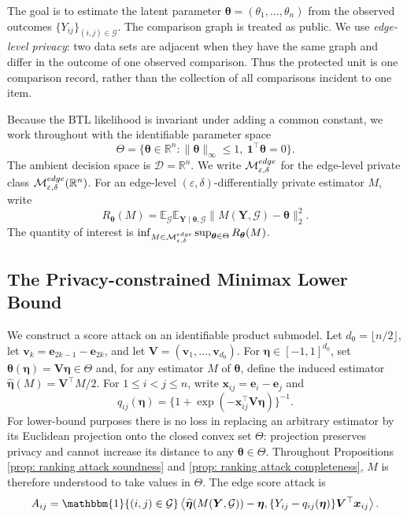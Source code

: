 \documentclass[letterpaper,12pt]{article}
\numberwithin{equation}{section}
\theoremstyle{plain}
\numberwithin{Theorem}{section}
\numberwithin{proposition}{section}
\numberwithin{Lemma}{section}
{
	\theoremstyle{definition}
	\newtheorem{Definition}{Definition}
	\newtheorem{example}{Example}
	\numberwithin{example}{section}
	\newtheorem{fact}{Fact}
	\numberwithin{fact}{section}
	\newtheorem{remark}{Remark}
}
\newcommand{\furtherrev}[1]{#1}
\newcommand{\1}{\mathbbm{1}}
\def\bth{{\boldsymbol{\theta}}}
\def\R{{\mathbb R}}
\def\E{\mathbb{E}}
\begin{document}
{
The goal is to estimate the latent parameter $\bth=(\theta_1,\ldots,\theta_n)$ from the observed outcomes $\{Y_{ij}\}_{(i,j)\in\mathcal G}$. The comparison graph is treated as public. We use \emph{edge-level privacy}: two data sets are adjacent when they have the same graph and differ in the outcome of one observed comparison. Thus the protected unit is one comparison record, rather than the collection of all comparisons incident to one item.

Because the BTL likelihood is invariant under adding a common constant, we work throughout with the identifiable parameter space
\[
\Theta=\{\bth\in\R^n:\|\bth\|_\infty\leq1,\ \bm1^\top\bth=0\}.
\]
\furtherrev{The ambient decision space is $\mathcal D=\mathbb R^n$. We write $\mathcal M^{\rm edge}_{\varepsilon,\delta}$ for the edge-level private class $\mathcal M^{\rm edge}_{\varepsilon,\delta}(\mathbb R^n)$.}
For an edge-level $(\varepsilon,\delta)$-differentially private estimator $M$, write
\[
R_\bth(M)=\E_{\mathcal G}\E_{\bm Y\mid\bth,\mathcal G}\|M(\bm Y,\mathcal G)-\bth\|_2^2.
\]
The quantity of interest is $\inf_{M\in\mathcal M^{\rm edge}_{\varepsilon,\delta}}\sup_{\bth\in\Theta}R_\bth(M)$.

\subsection{The Privacy-constrained Minimax Lower Bound}\label{sec: ranking lower bound}

We construct a score attack on an identifiable product submodel. Let $d_0=\lfloor n/2\rfloor$, let $\bm v_k=\bm e_{2k-1}-\bm e_{2k}$, and let $\bm V=(\bm v_1,\ldots,\bm v_{d_0})$. For $\bm\eta\in[-1,1]^{d_0}$, set $\bth(\bm\eta)=\bm V\bm\eta\in\Theta$ and, for any estimator $M$ of $\bth$, define the induced estimator $\widehat{\bm\eta}(M)=\bm V^\top M/2$. For $1\leq i<j\leq n$, write $\bm x_{ij}=\bm e_i-\bm e_j$ and
\[
q_{ij}(\bm\eta)=\{1+\exp(-\bm x_{ij}^\top\bm V\bm\eta)\}^{-1}.
\]
For lower-bound purposes there is no loss in replacing an arbitrary estimator by its Euclidean projection onto the closed convex set $\Theta$: projection preserves privacy and cannot increase its distance to any $\bth\in\Theta$. Throughout Propositions \ref{prop: ranking attack soundness} and \ref{prop: ranking attack completeness}, $M$ is therefore understood to take values in $\Theta$.
The edge score attack is
\begin{align*}
A_{ij}=\1\{(i,j)\in\mathcal G\}\left\langle\widehat{\bm\eta}(M(\bm Y,\mathcal G))-\bm\eta,
\{Y_{ij}-q_{ij}(\bm\eta)\}\bm V^\top\bm x_{ij}\right\rangle.
\end{align*}

}
\end{document}

